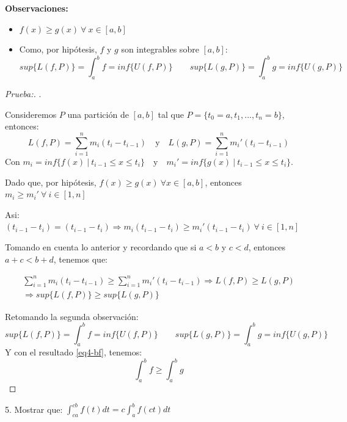 \documentclass[12pt]{article}
\begin{document}
\begin{enumerate}[\hspace{9px} a)]
        \textbf{Observaciones: }
        \begin{itemize}
            \item \(f(x) \geq g(x) \ \forall \ x \in [a,b]\)
            \item Como, por hip\'otesis, $f$ y $g$ son integrables sobre $[a,b]$: \[sup\{L(f,P)\}=\int_{a}^{b}f=inf\{U(f,P)\} \qquad sup\{L(g,P)\}=\int_{a}^{b}g=inf\{U(g,P)\}\]
        \end{itemize}

        \begin{proof}[Prueba:]
            . \medskip

            Consideremos $P$ una partici\'on de $[a,b]$ tal que \(P=\{t_0=a,t_1,...,t_n=b\}\), entonces:
            \[L(f,P) = \sum_{i=1}^n m_i(t_i-t_{i-1}) \quad \text{y} \quad L(g,P) = \sum_{i=1}^n m_i'(t_i-t_{i-1})\]
            Con \(m_i=inf\{f(x) \ | \ t_{i-1} \leq x \leq t_i\} \quad \text{y} \quad m_i'=inf\{g(x) \ | \ t_{i-1} \leq x \leq t_i\}\).\medskip

            Dado que, por hip\'otesis, \(f(x)\geq g(x) \ \forall x \in [a,b]\), entonces \(m_i \geq m_i' \ \forall \ i \in [1,n]\)\medskip

            Asi: \qquad \((t_{i-1}-t_i)=(t_{i-1}-t_i) \Longrightarrow m_i(t_{i-1}-t_i)\geq m_i'(t_{i-1}-t_i) \ \forall \ i \in [1,n]\)

            Tomando en cuenta lo anterior y recordando que si \(a<b\) y \(c<d\), entonces \(a+c<b+d\), tenemos que:

            \begin{multline}
                \label{eq4-bf}
                \sum_{i=1}^n m_i(t_i-t_{i-1})\geq\sum_{i=1}^n m_i'(t_i-t_{i-1}) \Longrightarrow L(f,P)\geq L(g,P) \\ \Longrightarrow sup\{L(f,P)\}\geq sup\{L(g,P)\}
            \end{multline}

            Retomando la segunda observaci\'on: \[sup\{L(f,P)\}=\int_{a}^{b}f=inf\{U(f,P)\} \qquad sup\{L(g,P)\}=\int_{a}^{b}g=inf\{U(g,P)\}\]
            Y con el resultado \eqref{eq4-bf}, tenemos:
            \[\int_{a}^{b}f\geq\int_{a}^{b}g\]
        \end{proof}

\end{enumerate}

5. Mostrar que: \quad \(\displaystyle\int_{ca}^{cb}f(t)dt=c\displaystyle\int_{a}^{b}f(ct)dt\)
\end{document}
